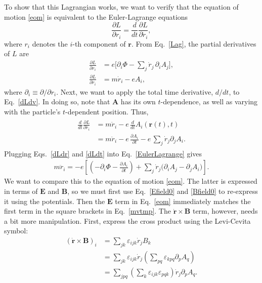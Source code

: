 \documentclass[prx,12pt]{revtex4-2}
\begin{document}
To show that this Lagrangian works, we want to verify that the
equation of motion \eqref{eom} is equivalent to the Euler-Lagrange
equations
\begin{equation}
  \frac{\partial L}{\partial r_i} = \frac{d}{dt}
  \frac{\partial L}{\partial \dot{r}_i},
  \label{EulerLagrange}
\end{equation}
where $r_i$ denotes the $i$-th component of $\mathbf{r}$.  From
Eq.~\eqref{Lag}, the partial derivatives of $L$ are
\begin{align}
  \frac{\partial L}{\partial r_i} &=
  e\Big[\partial_i \Phi - \sum_j \dot{r}_j \,\partial_i A_j \Big],\label{dLdr}\\
  \frac{\partial L}{\partial \dot{r}_i} &= m\dot{r}_i - e A_i,
  \label{dLdv}
\end{align}
where $\partial_i \equiv \partial/\partial r_i$.  Next, we want to
apply the total time derivative, $d/dt$, to Eq.~\eqref{dLdv}.  In
doing so, note that $\mathbf{A}$ has its own $t$-dependence, as well
as varying with the particle's $t$-dependent position.  Thus,
\begin{align}
  \begin{aligned}
    \frac{d}{dt} \frac{\partial L}{\partial \dot{r}_i}
    &= m\ddot{r}_i - e\, \frac{d}{dt} A_i(\mathbf{r}(t),t) \\
    &= m\ddot{r}_i - e\, \frac{\partial A_i}{\partial t}
    - e\, \sum_j \dot{r}_j \partial_j A_i.
  \end{aligned}
  \label{dLdt}
\end{align}
Plugging Eqs.~\eqref{dLdr} and \eqref{dLdt} into
Eq.~\eqref{EulerLagrange} gives
\begin{align}
  m\ddot{r}_i =
  -e\left[\left(-\partial_i \Phi - \frac{\partial A_i}{\partial t}\right)
    + \sum_j \dot{r}_j \Big( \partial_i A_j - \partial_j A_i\Big) \right].
  \label{mvtmp}
\end{align}
We want to compare this to the equation of motion \eqref{eom}.  The
latter is expressed in terms of $\mathbf{E}$ and $\mathbf{B}$, so we
must first use Eq.~\eqref{Efield0} and \eqref{Bfield0} to re-express
it using the potentials.  Then the $\mathbf{E}$ term in
Eq.~\eqref{eom} immediately matches the first term in the square
brackets in Eq.~\eqref{mvtmp}.  The $\dot{\mathbf{r}}\times\mathbf{B}$
term, however, needs a bit more manipulation.  First, express the
cross product using the Levi-Cevita symbol:
\begin{align}
  (\dot{\mathbf{r}} \times \mathbf{B})_i &=
  \sum_{jk} \varepsilon_{ijk} \dot{r}_j B_k \\
  &= \sum_{jk} \varepsilon_{ijk} \dot{r}_j \left(\sum_{pq} \varepsilon_{kpq} \partial_p A_q  \right) \\
  &= \sum_{jpq} \left(\sum_k \varepsilon_{ijk} \varepsilon_{pqk}\right)
  \dot{r}_j  \partial_p A_q.
  \label{vBtmp}
\end{align}
\end{document}

